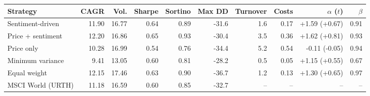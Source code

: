 \begin{tabular}{lrrrrrrrrr}
\toprule
Strategy & CAGR & Vol. & Sharpe & Sortino & Max DD & Turnover & Costs & $\alpha$ ($t$) & $\beta$ \\
\midrule
Sentiment-driven & 11.90 & 16.77 & 0.64 & 0.89 & -31.6 & 1.6 & 0.17 & +1.59 (+0.67) & 0.91 \\
Price + sentiment & 12.20 & 16.86 & 0.65 & 0.93 & -30.4 & 3.5 & 0.36 & +1.62 (+0.81) & 0.93 \\
Price only & 10.28 & 16.99 & 0.54 & 0.76 & -34.4 & 5.2 & 0.54 & -0.11 (-0.05) & 0.94 \\
Minimum variance & 9.41 & 13.05 & 0.60 & 0.81 & -28.2 & 0.5 & 0.05 & +1.15 (+0.55) & 0.67 \\
Equal weight & 12.15 & 17.46 & 0.63 & 0.90 & -36.7 & 1.2 & 0.13 & +1.30 (+0.65) & 0.97 \\
MSCI World (URTH) & 11.18 & 16.59 & 0.60 & 0.85 & -32.7 & -- & -- & -- & -- \\
\bottomrule
\end{tabular}

